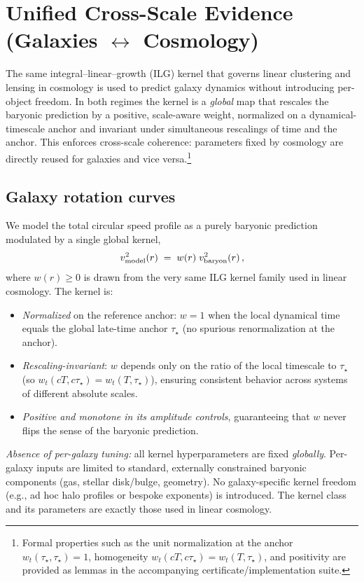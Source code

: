 \documentclass[11pt]{article}
\begin{document}
\section{Unified Cross-Scale Evidence (Galaxies \texorpdfstring{$\leftrightarrow$}{↔} Cosmology)}
The same integral–linear–growth (ILG) kernel that governs linear clustering and lensing in cosmology is used to predict galaxy dynamics without introducing per-object freedom. In both regimes the kernel is a \emph{global} map that rescales the baryonic prediction by a positive, scale-aware weight, normalized on a dynamical-timescale anchor and invariant under simultaneous rescalings of time and the anchor. This enforces cross-scale coherence: parameters fixed by cosmology are directly reused for galaxies and vice versa.\footnote{Formal properties such as the unit normalization at the anchor $w_t(\tau_\star,\tau_\star)=1$, homogeneity $w_t(cT,c\tau_\star)=w_t(T,\tau_\star)$, and positivity are provided as lemmas in the accompanying certificate/implementation suite.}

\subsection{Galaxy rotation curves}
We model the total circular speed profile as a purely baryonic prediction modulated by a single global kernel,
\begin{equation}
  v^2_{\rm model}(r)\;=\;w(r)\;v^2_{\rm baryon}(r)\,,
\end{equation}
where $w(r)\ge 0$ is drawn from the very same ILG kernel family used in linear cosmology. The kernel is:
\begin{itemize}
  \item \emph{Normalized} on the reference anchor: $w=1$ when the local dynamical time equals the global late-time anchor $\tau_\star$ (no spurious renormalization at the anchor).
  \item \emph{Rescaling-invariant}: $w$ depends only on the ratio of the local timescale to $\tau_\star$ (so $w_t(cT,c\tau_\star)=w_t(T,\tau_\star)$), ensuring consistent behavior across systems of different absolute scales.
  \item \emph{Positive and monotone in its amplitude controls}, guaranteeing that $w$ never flips the sense of the baryonic prediction.
\end{itemize}
\emph{Absence of per-galaxy tuning:} all kernel hyperparameters are fixed \emph{globally}. Per-galaxy inputs are limited to standard, externally constrained baryonic components (gas, stellar disk/bulge, geometry). No galaxy-specific kernel freedom (e.g., ad hoc halo profiles or bespoke exponents) is introduced. The kernel class and its parameters are exactly those used in linear cosmology.
\end{document}
